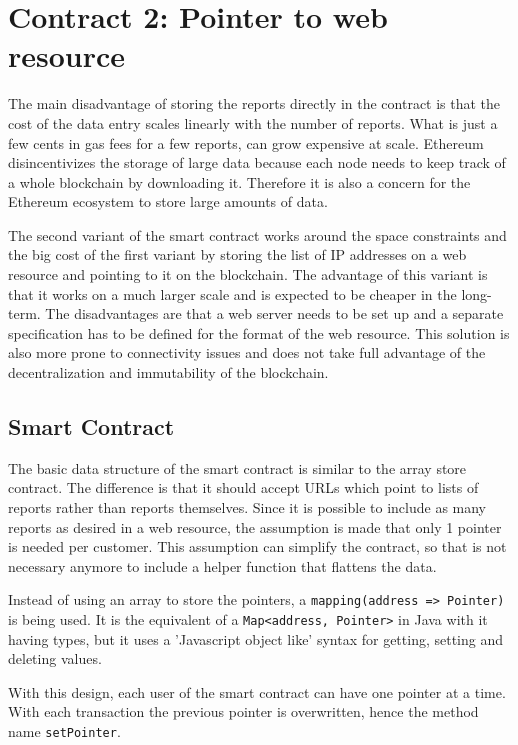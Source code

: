 \section{Contract 2: Pointer to web resource}
The main disadvantage of storing the reports directly in the contract is that the cost of the data entry scales linearly with the number of reports. What is just a few cents in gas fees for a few reports, can grow expensive at scale.
Ethereum disincentivizes the storage of large data because each node needs to keep track of a whole blockchain by downloading it. Therefore it is also a concern for the Ethereum ecosystem to store large amounts of data.

The second variant of the smart contract works around the space constraints and the big cost of the first variant by storing the list of IP addresses on a web resource and pointing to it on the blockchain. The advantage of this variant is that it works on a much larger scale and is expected to be cheaper in the long-term. The disadvantages are that a web server needs to be set up and a separate specification has to be defined for the format of the web resource. This solution is also more prone to connectivity issues and does not take full advantage of the decentralization and immutability of the blockchain.

\subsection{Smart Contract}
The basic data structure of the smart contract is similar to the array store contract. The difference is that it should accept URLs which point to lists of reports rather than reports themselves. Since it is possible to include as many reports as desired in a web resource, the assumption is made that only 1 pointer is needed per customer. This assumption can simplify the contract, so that is not necessary anymore to include a helper function that flattens the data.



Instead of using an array to store the pointers, a \texttt{mapping(address => Pointer)} is being used. It is the equivalent of a \texttt{Map<address, Pointer>} in Java with it having types, but it uses a 'Javascript object like' syntax for getting, setting and deleting values.

With this design, each user of the smart contract can have one pointer at a time. With each transaction the previous pointer is overwritten, hence the method name \texttt{setPointer}.

